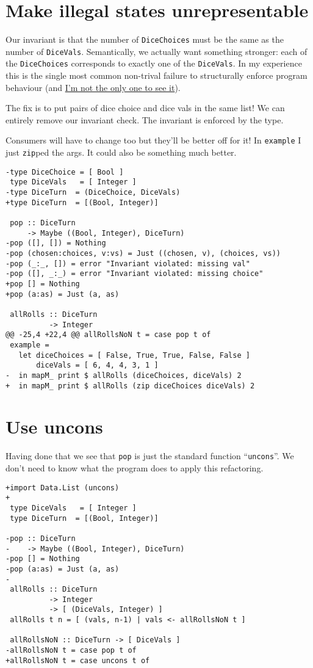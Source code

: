 \section{Make illegal states unrepresentable}


Our invariant is that the number of \texttt{DiceChoices} must be the same as the number of \texttt{DiceVals}. Semantically, we actually want something stronger: each of the \texttt{DiceChoices} corresponds to exactly one of the \texttt{DiceVals}. In my experience this is the single most common non-trival failure to structurally enforce program behaviour (and \href{https://twitter.com/fried_brice/status/1178140883633479680}{I'm not the only one to see it}).

The fix is to put pairs of dice choice and dice vals in the same list! We can entirely remove our invariant check. The invariant is enforced by the type.

Consumers will have to change too but they'll be better off for it! In \texttt{example} I just \texttt{zip}ped the args. It could also be something much better.

\begin{verbatim}
-type DiceChoice = [ Bool ]
 type DiceVals   = [ Integer ]
-type DiceTurn  = (DiceChoice, DiceVals)
+type DiceTurn  = [(Bool, Integer)]

 pop :: DiceTurn
     -> Maybe ((Bool, Integer), DiceTurn)
-pop ([], []) = Nothing
-pop (chosen:choices, v:vs) = Just ((chosen, v), (choices, vs))
-pop (_:_, []) = error "Invariant violated: missing val"
-pop ([], _:_) = error "Invariant violated: missing choice"
+pop [] = Nothing
+pop (a:as) = Just (a, as)

 allRolls :: DiceTurn
          -> Integer
@@ -25,4 +22,4 @@ allRollsNoN t = case pop t of
 example =
   let diceChoices = [ False, True, True, False, False ]
       diceVals = [ 6, 4, 4, 3, 1 ]
-  in mapM_ print $ allRolls (diceChoices, diceVals) 2
+  in mapM_ print $ allRolls (zip diceChoices diceVals) 2
\end{verbatim}

\section{Use uncons}

Having done that we see that \texttt{pop} is just the standard function ``\texttt{uncons}''. We don't need to know what the program does to apply this refactoring.

\begin{verbatim}
+import Data.List (uncons)
+
 type DiceVals   = [ Integer ]
 type DiceTurn  = [(Bool, Integer)]

-pop :: DiceTurn
-    -> Maybe ((Bool, Integer), DiceTurn)
-pop [] = Nothing
-pop (a:as) = Just (a, as)
-
 allRolls :: DiceTurn
          -> Integer
          -> [ (DiceVals, Integer) ]
 allRolls t n = [ (vals, n-1) | vals <- allRollsNoN t ]

 allRollsNoN :: DiceTurn -> [ DiceVals ]
-allRollsNoN t = case pop t of
+allRollsNoN t = case uncons t of
\end{verbatim}


